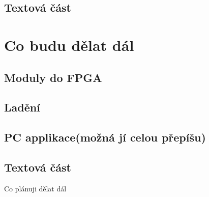 \documentclass{beamer}
\begin{document}
\subsection{Textová část}


\section{Co budu dělat dál}
\localtableofcontents
\subsection{Moduly do FPGA}
\subsection{Ladění}
\subsection{PC applikace(možná jí celou přepíšu)}
\subsection{Textová část}



\begin{frame}{Co plánuji dělat dál}
\end{frame}
\end{document}
